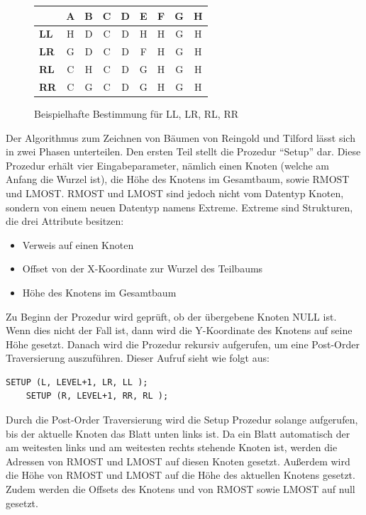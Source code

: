 \begin{figure}[ht]
\begin{minipage}[]{0.3\linewidth}
    \end{minipage}
    \hfill
    \begin{minipage}[]{0.65\linewidth}
        \centering
        \begin{tabular}{l | c | c | c | c | c | c | c | c}
            & A & B & C & D & E & F & G & H \\
            \hline\hline
            \textbf{LL} & H & D & C & D & H & H & G & H \\
            \textbf{LR} & G & D & C & D & F & H & G & H \\
            \textbf{RL} & C & H & C & D & G & H & G & H \\
            \textbf{RR} & C & G & C & D & G & H & G & H \\
            \end{tabular}
    \end{minipage} 
    \caption{Beispielhafte Bestimmung für \ac{LL}, \ac{LR}, \ac{RL}, \ac{RR}}
\end{figure}

Der Algorithmus zum Zeichnen von Bäumen von Reingold und Tilford lässt sich in zwei Phasen unterteilen.
Den ersten Teil stellt die Prozedur “Setup” dar. Diese Prozedur erhält vier Eingabeparameter, nämlich einen Knoten (welche am Anfang 
die Wurzel ist), die Höhe des Knotens im Gesamtbaum, sowie RMOST und LMOST. RMOST und LMOST sind jedoch nicht vom Datentyp Knoten, sondern 
von einem neuen Datentyp namens Extreme. Extreme sind Strukturen, die drei Attribute besitzen: 
\begin{itemize}
    \item Verweis auf einen Knoten
    \item Offset von der X-Koordinate zur Wurzel des Teilbaums
    \item Höhe des Knotens im Gesamtbaum
\end{itemize}

Zu Beginn der Prozedur wird geprüft, ob der übergebene Knoten NULL ist. Wenn dies nicht der Fall ist, 
dann wird die Y-Koordinate des Knotens auf seine Höhe gesetzt. Danach wird die Prozedur rekursiv aufgerufen, 
um eine Post-Order Traversierung auszuführen. Dieser Aufruf sieht wie folgt aus:

\begin{lstlisting}[caption = Rekursiver Aufruf von Setup]
    SETUP (L, LEVEL+1, LR, LL );
    SETUP (R, LEVEL+1, RR, RL );
\end{lstlisting}

Durch die Post-Order Traversierung wird die Setup Prozedur solange aufgerufen, bis der aktuelle Knoten das Blatt unten links ist. 
Da ein Blatt automatisch der am weitesten links und am weitesten rechts stehende Knoten ist, werden die Adressen von 
RMOST und LMOST auf diesen Knoten gesetzt. Außerdem wird die Höhe von RMOST und LMOST auf die Höhe des aktuellen Knotens gesetzt. 
Zudem werden die Offsets des Knotens und von RMOST sowie LMOST auf null gesetzt. 

